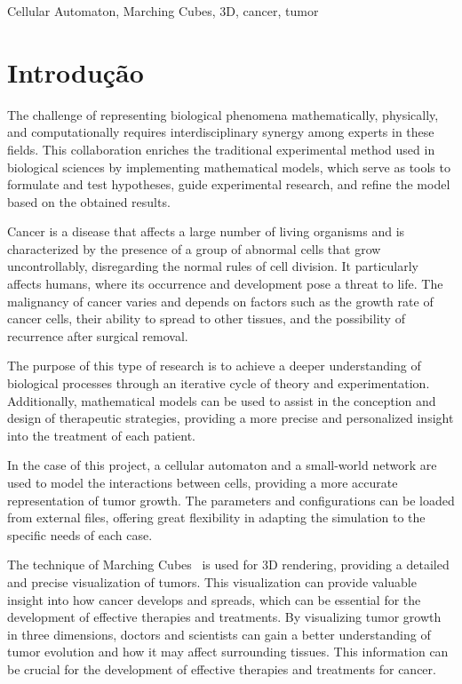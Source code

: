 \documentclass[a4paper,11pt]{article}
\begin{document}
{{\vskip 0.2cm  %


{\small{ %
 Cellular Automaton, Marching Cubes, 3D, cancer, tumor
}}
}


\section*{Introdução}

The challenge of representing biological phenomena mathematically, physically, and computationally requires interdisciplinary synergy among experts in these fields. This collaboration enriches the traditional experimental method used in biological sciences by implementing mathematical models, which serve as tools to formulate and test hypotheses, guide experimental research, and refine the model based on the obtained results.~\cite{Darien}

Cancer is a disease that affects a large number of living organisms and is characterized by the presence of a group of abnormal cells that grow uncontrollably, disregarding the normal rules of cell division. It particularly affects humans, where its occurrence and development pose a threat to life. The malignancy of cancer varies and depends on factors such as the growth rate of cancer cells, their ability to spread to other tissues, and the possibility of recurrence after surgical removal.

The purpose of this type of research is to achieve a deeper understanding of biological processes through an iterative cycle of theory and experimentation. Additionally, mathematical models can be used to assist in the conception and design of therapeutic strategies, providing a more precise and personalized insight into the treatment of each patient.

In the case of this project, a cellular automaton and a small-world network are used to model the interactions between cells, providing a more accurate representation of tumor growth. The parameters and configurations can be loaded from external files, offering great flexibility in adapting the simulation to the specific needs of each case.

The technique of Marching Cubes~\cite{paper de Marching Cubes} is used for 3D rendering, providing a detailed and precise visualization of tumors. This visualization can provide valuable insight into how cancer develops and spreads, which can be essential for the development of effective therapies and treatments. By visualizing tumor growth in three dimensions, doctors and scientists can gain a better understanding of tumor evolution and how it may affect surrounding tissues. This information can be crucial for the development of effective therapies and treatments for cancer.


}
\end{document}
